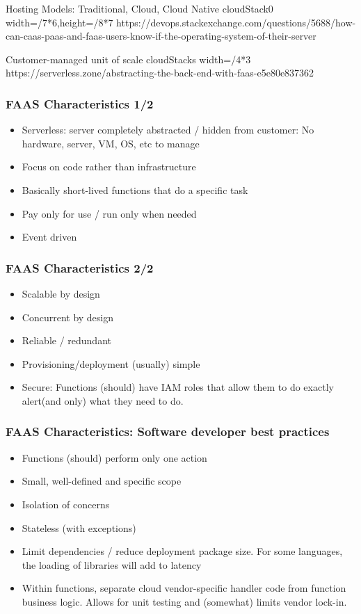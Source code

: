 \documentclass[11pt,aspectratio=169]{beamer}
\begin{document}
\nrcanGraphicFrame
  {Hosting Models: Traditional, Cloud, Cloud Native}
  {cloudStack0}
  {width=\paperwidth/7*6,height=\paperheight/8*7}
  {https://devops.stackexchange.com/questions/5688/how-can-caas-paas-and-faas-users-know-if-the-operating-system-of-their-server}

\nrcanGraphicFrame
  {Customer-managed unit of scale}
  {cloudStacks}
  {width=\paperwidth/4*3}
  {https://serverless.zone/abstracting-the-back-end-with-faas-e5e80e837362}

\begin{nrcanFrame}
  \frametitle{FAAS Characteristics 1/2}
  \begin{itemize}
  \item Serverless: server completely abstracted / hidden from
    customer: No hardware, server, VM, OS, etc to manage
  \item Focus on code rather than infrastructure
  \item Basically short-lived functions that do a specific task
  \item Pay only for use / run only when needed
  \item Event driven
  \end{itemize}
\end{nrcanFrame}


\begin{nrcanFrame}
  \frametitle{FAAS Characteristics 2/2}
  \begin{itemize}
  \item Scalable by design
  \item Concurrent by design
  \item Reliable / redundant 
  \item Provisioning/deployment (usually) simple
  \item \alert{Secure}: Functions (should) have IAM roles that 
    allow them to do exactly
    alert{(and only)} what they need to do.
  \end{itemize}
\end{nrcanFrame}



\begin{nrcanFrame}
  \frametitle{FAAS Characteristics: Software developer best practices}
    \begin{itemize}
  \item Functions (should) perform only one action
  \item Small, well-defined and specific scope
  \item Isolation of concerns
  \item Stateless (with exceptions)
  \item Limit dependencies / reduce deployment package size. For some languages, the loading of
    libraries will add to latency
  \item Within functions, separate cloud vendor-specific handler code from function business
    logic.
    Allows for unit testing and (somewhat) limits vendor lock-in.
    \end{itemize}
\end{nrcanFrame}
\end{document}
